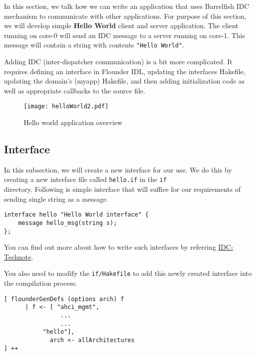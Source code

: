 In this section, we talk how we can write an application that uses Barrelfish
IDC mechanism to communicate with other applications.  For purpose of this
section, we will develop simple \textbf{Hello World} client and server
application.  The client running on core-0 will send an IDC message to a
server running on core-1.  This message will contain a string with contents
\texttt{"Hello World"}.

Adding IDC (inter-dispatcher communication) is a bit more complicated. It
requires defining an interface in Flounder IDL, updating the interfaces
Hakefile, updating the domain's (myapp) Hakefile, and then adding initialization
code as well as appropriate callbacks to the source file.

\begin{figure}
  \begin{center}
    \texttt{[image: helloWorld2.pdf]}
  \end{center}
  \caption{Hello world application overview}
  \label{fig:helloWorld}
\end{figure}

\subsection{Interface}

In this subsection, we will create a new interface
for our use.  We do this by creating a new interface file called
\texttt{hello.if} in the \texttt{if\\} directory. Following is simple interface
that will suffice for our requirements of sending single string as a message.



\begin{verbatim}
interface hello "Hello World interface" {
    message hello_msg(string s);
};
\end{verbatim}

You can find out more about how to write such interfaces by referring
\href{http://www.barrelfish.org/TN-011-IDC.pdf}{IDC-Technote}.

You also need to modify the \texttt{if/Hakefile} to add this newly created
interface into the compilation process.

\begin{verbatim}
[ flounderGenDefs (options arch) f
      | f <- [ "ahci_mgmt",
                ...
                ...
 	       "hello"],
             arch <- allArchitectures
] ++
\end{verbatim}

